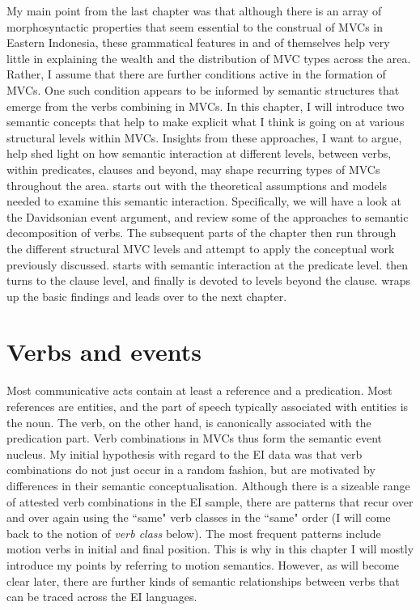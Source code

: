 My main point from the last chapter was that although there is an array of morphosyntactic properties that seem essential to the construal of MVCs in Eastern Indonesia, these grammatical features in and of themselves help very little in explaining the wealth and the distribution of MVC types across the area. Rather, I assume that there are further conditions active in the formation of MVCs. One such condition appears to be informed by semantic structures that emerge from the verbs combining in MVCs. In this chapter, I will introduce two semantic concepts that help to make explicit what I think is going on at various structural levels within MVCs. Insights from these approaches, I want to argue, help shed light on how semantic interaction at different levels, between verbs, within predicates, clauses and beyond, may shape recurring types of MVCs throughout the area.  starts out with the theoretical assumptions and models needed to examine this semantic interaction. Specifically, we will have a look at the Davidsonian event argument, and review some of the approaches to semantic decomposition of verbs. The subsequent parts of the chapter then run through the different structural MVC levels and attempt to apply the conceptual work previously discussed.  starts with semantic interaction at the predicate level.  then turns to the clause level, and  finally is devoted to levels beyond the clause.  wraps up the basic findings and leads over to the next chapter.

\section{Verbs and events}
\label{sec:verbsevents}

Most communicative acts contain at least a reference and a predication. Most references are entities, and the part of speech typically associated with entities is the noun. The verb, on the other hand, is canonically associated with the predication part. Verb combinations in MVCs thus form the semantic event nucleus. My initial hypothesis with regard to the EI data was that verb combinations do not just occur in a random fashion, but are motivated by differences in their semantic conceptualisation. Although there is a sizeable range of attested verb combinations in the EI sample, there are patterns that recur over and over again using the ``same" verb classes in the ``same" order (I will come back to the notion of \textit{verb class} below). The most frequent patterns include motion verbs in initial and final position. This is why in this chapter I will mostly introduce my points by referring to motion semantics. However, as will become clear later, there are further kinds of semantic relationships between verbs that can be traced across the EI languages. 

